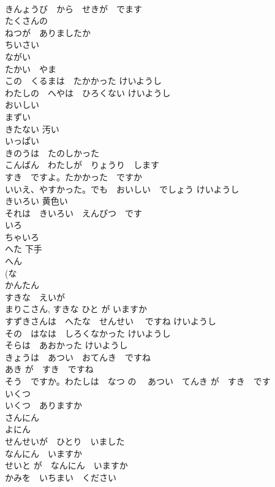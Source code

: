 \documentclass[8pt]{extreport}
\begin{document}
\begin{CJK}{UTF8}{min}
\\	きんょうび　から　せきが　でます	
\\	たくさんの	
\\	ねつが　ありましたか	
\\	ちいさい	
\\	ながい	
\\	たかい　やま	
\\	この　くるまは　たかかった	けいようし 
\\	わたしの　へやは　ひろくない	けいようし
\\	おいしい	
\\	まずい	
\\	きたない	汚い
\\	いっぱい	
\\	きのうは　たのしかった	
\\	こんばん　わたしが　りょうり　します	
\\	すき　ですよ。たかかった　ですか	
\\	いいえ、やすかった。でも　おいしい　でしょう	けいようし
\\	きいろい	黄色い
\\	それは　きいろい　えんぴつ　です	
\\	いろ	
\\	ちゃいろ	
\\	へた	下手
\\	へん	
\\	(な 
\\	かんたん	
\\	すきな　えいが	
\\	まりこさん, すきな ひと が いますか	
\\	すずきさんは　へたな　せんせい　 ですね	けいようし 
\\	その　はなは　しろくなかった	けいようし
\\	そらは　あおかった	けいようし
\\	きょうは　あつい　おてんき　ですね	
\\	あき が　すき　ですね	
\\	そう　ですか。わたしは　なつ の　 あつい　てんき が　すき　です	
\\	いくつ	
\\	いくつ　ありますか	
\\	さんにん	
\\	よにん	
\\	せんせいが　ひとり　いました	
\\	なんにん　いますか	
\\	せいと が　なんにん　いますか	
\\	かみを　いちまい　ください	

\end{CJK}
\end{document}
